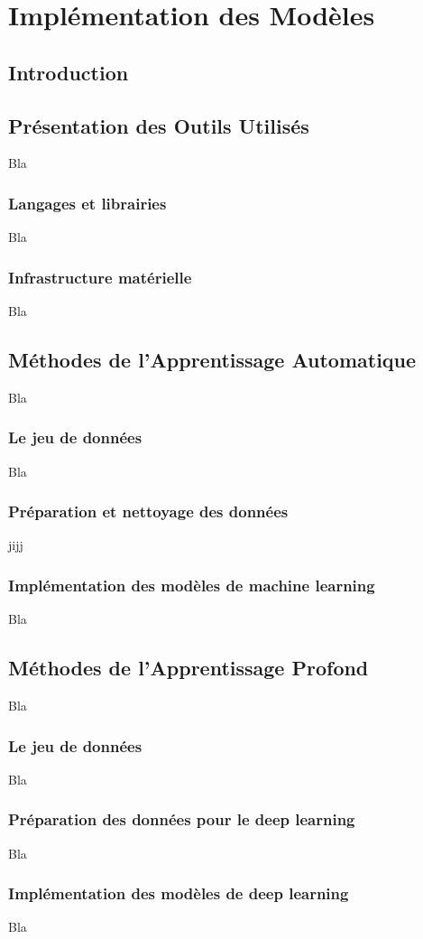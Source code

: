 \chapter{Implémentation des Modèles}

\section{Introduction}

\section{Présentation des Outils Utilisés}

Bla

\subsection{Langages et librairies}

Bla

\subsection{Infrastructure matérielle}

Bla

\section{Méthodes de l'Apprentissage Automatique}

Bla

\subsection{Le jeu de données}

Bla

\subsection{Préparation et nettoyage des données}

jijj

\subsection{Implémentation des modèles de machine learning}

Bla

\section{Méthodes de l'Apprentissage Profond}

Bla

\subsection{Le jeu de données}

Bla

\subsection{Préparation des données pour le deep learning}

Bla

\subsection{Implémentation des modèles de deep learning}

Bla